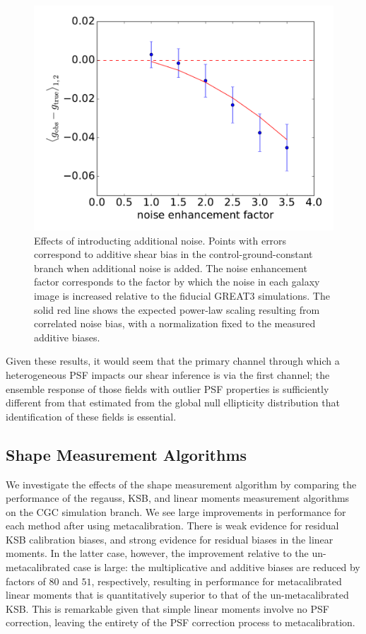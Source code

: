 \documentclass[iop]{emulateapj}
\begin{document}
\begin{figure}
\includegraphics[width=\columnwidth]{noise_bias_test.pdf}
\caption{Effects of introducting additional noise. Points with errors
  correspond to additive shear bias in the control-ground-constant
  branch when additional noise is added. The noise enhancement factor
  corresponds to the factor by which the noise in each galaxy image is
  increased relative to the fiducial GREAT3 simulations. The solid red
  line shows the expected power-law scaling resulting from correlated
  noise bias, with a normalization fixed to the measured additive
  biases.}
\label{fig:noise_bias}
\end{figure}


Given these results, it would seem that the primary channel through
which a heterogeneous PSF impacts our shear inference is via the first
channel; the ensemble response of those fields with outlier PSF
properties is sufficiently different from that estimated from the
global null ellipticity distribution that identification of these fields
is essential.

\subsection{Shape Measurement Algorithms}
We investigate the effects of the shape measurement algorithm by
comparing the performance of the regauss, KSB, and linear moments
measurement algorithms on the CGC simulation branch. We see large
improvements in performance for each method after using
metacalibration. There is weak evidence for residual KSB calibration
biases, and strong evidence for residual biases in the linear
moments. In the latter case, however, the improvement relative to the
un-metacalibrated case is large: the multiplicative and additive
biases are reduced by factors of $80$ and $51$, respectively,
resulting in performance for metacalibrated linear moments that is
quantitatively superior to that of the un-metacalibrated KSB.  This is
remarkable given that simple linear moments involve no PSF correction,
leaving the entirety of the PSF correction process to metacalibration.
\end{document}
